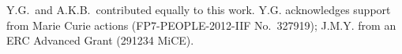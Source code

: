 \documentclass[aps,prl,reprint,twocolumn,superscriptaddress,showpacs]{revtex4-1}
\newcommand{\vcrm}[1]{\mathbf{#1}}
\newcommand{\hvcrm}[1]{\mathbf{\hat{#1}}}
\newcommand{\vc}[1]{\boldsymbol{#1}}
\newcommand{\hvc}[1]{\boldsymbol{\hat{#1}}}
\newcommand{\kk}{\mathrm{k}_B}
\begin{document}
Y.G.\ and A.K.B.\ contributed equally to this work. Y.G. acknowledges support from Marie Curie actions (FP7-PEOPLE-2012-IIF No.\ 327919); J.M.Y. from an ERC Advanced Grant (291234 MiCE).






%
\end{document}
